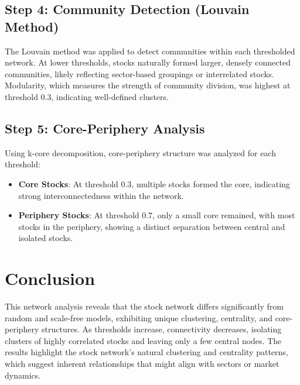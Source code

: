 \documentclass[12pt]{article}
\begin{document}
\subsection{Step 4: Community Detection (Louvain Method)}
The Louvain method was applied to detect communities within each thresholded network. At lower thresholds, stocks naturally formed larger, densely connected communities, likely reflecting sector-based groupings or interrelated stocks. Modularity, which measures the strength of community division, was highest at threshold 0.3, indicating well-defined clusters.

\subsection{Step 5: Core-Periphery Analysis}
Using k-core decomposition, core-periphery structure was analyzed for each threshold:
\begin{itemize}
    \item \textbf{Core Stocks}: At threshold 0.3, multiple stocks formed the core, indicating strong interconnectedness within the network.
    \item \textbf{Periphery Stocks}: At threshold 0.7, only a small core remained, with most stocks in the periphery, showing a distinct separation between central and isolated stocks.
\end{itemize}

\section{Conclusion}
This network analysis reveals that the stock network differs significantly from random and scale-free models, exhibiting unique clustering, centrality, and core-periphery structures. As thresholds increase, connectivity decreases, isolating clusters of highly correlated stocks and leaving only a few central nodes. The results highlight the stock network’s natural clustering and centrality patterns, which suggest inherent relationships that might align with sectors or market dynamics.
%
%
\end{document}

